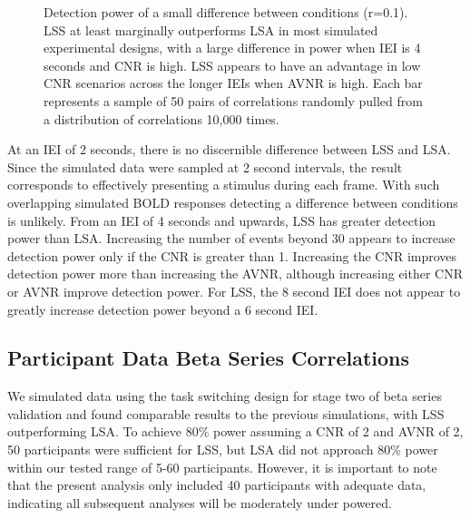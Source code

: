 \documentclass[phd,appendix,figures]{uithesis}
\begin{document}
\begin{figure}[H]
  \centering


  \caption[Simulation results for LSA/LSS]{
    Detection power of a small difference between conditions (r=0.1).
    LSS at least marginally outperforms LSA in most simulated experimental
    designs, with a large difference in power when IEI is 4 seconds and
    CNR is high.
    LSS appears to have an advantage in low CNR scenarios across the longer IEIs
    when AVNR is high.
    Each bar represents a sample of 50 pairs of correlations
    randomly pulled from a distribution of correlations 10,000 times.
  }
  \label{fig:res_sim_smalldiff}
\end{figure}

At an IEI of 2 seconds, there is no discernible difference between LSS and LSA.
Since the simulated data were sampled at 2 second intervals, the result
corresponds to effectively presenting a stimulus during each frame.
With such overlapping simulated BOLD responses detecting a difference between conditions
is unlikely.
From an IEI of 4 seconds and upwards, LSS has greater detection power than LSA.
Increasing the number of events beyond 30 appears to increase detection power only if the CNR is greater than 1.
Increasing the CNR improves detection power more than increasing the AVNR, although increasing either
CNR or AVNR improve detection power.
For LSS, the 8 second IEI does not appear to greatly increase detection power beyond a 6 second IEI.

\subsection*{Participant Data Beta Series Correlations}
\label{results:bsc-taskswitch}

We simulated data using the task switching design for stage two of beta series
validation and found comparable
results to the previous simulations, with LSS outperforming LSA.
To achieve 80\% power assuming a CNR of 2 and AVNR of 2, 50 participants were sufficient for LSS, but LSA
did not approach 80\% power within our tested range of 5-60 participants.
However, it is important to note that the present analysis only included 40 participants with adequate data,
indicating all subsequent analyses will be moderately under powered.
\end{document}
